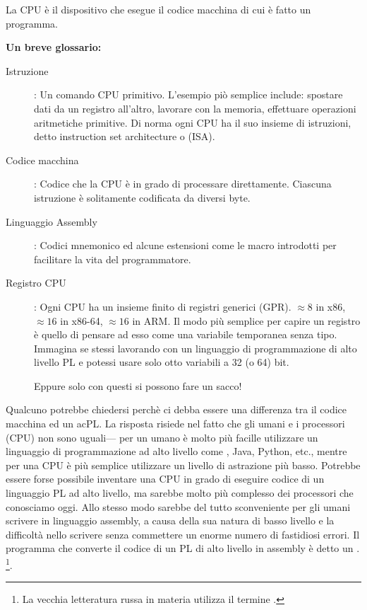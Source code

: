 
La \ac{CPU} è il dispositivo che esegue il codice macchina di cui è fatto un programma.

\textbf{Un breve glossario:}

\begin{description}
\item[Istruzione]: Un comando \ac{CPU} primitivo.
L'esempio piò semplice include: spostare dati da un registro all'altro, lavorare con la memoria, effettuare operazioni aritmetiche primitive.
Di norma ogni \ac{CPU} ha il suo insieme di istruzioni, detto instruction set architecture o (\ac{ISA}).

\item[Codice macchina]: Codice che la \ac{CPU} è in grado di processare direttamente. 
Ciascuna istruzione è solitamente codificata da diversi byte.
\item[Linguaggio Assembly]: Codici mnemonico ed alcune estensioni come le macro introdotti per facilitare la vita del programmatore.
\item[Registro CPU]: Ogni \ac{CPU} ha un insieme finito di registri generici (\ac{GPR}).
$\approx 8$ in x86, $\approx 16$ in x86-64, $\approx 16$ in ARM.
Il modo più semplice per capire un registro è quello di pensare ad esso come una variabile temporanea senza tipo.
Immagina se stessi lavorando con un linguaggio di programmazione di alto livello \ac{PL} e potessi usare solo otto variabili a 32 (o 64) bit.

Eppure solo con questi si possono fare un sacco!
\end{description}


Qualcuno potrebbe chiedersi perchè ci debba essere una differenza tra il codice macchina ed un ac{PL}. La risposta risiede nel fatto che gli umani e i processori (\ac{CPU}) non sono uguali---%
per un umano è molto più facille utilizzare un linguaggio di programmazione ad alto livello come \CCpp, Java, Python, etc., mentre per una \ac{CPU} è più semplice utilizzare un livello di astrazione più basso.
Potrebbe essere forse possibile inventare una \ac{CPU} in grado di eseguire codice di un linguaggio \ac{PL} ad alto livello, ma sarebbe molto più complesso dei processori che conosciamo oggi.
Allo stesso modo sarebbe del tutto sconveniente per gli umani scrivere in linguaggio assembly, a causa della sua natura di basso livello e la difficoltà nello scrivere senza commettere un enorme numero di fastidiosi errori.
Il programma che converte il codice di un \ac{PL} di alto livello in assembly è detto un .
\footnote{La vecchia letteratura russa in materia utilizza il termine .}.

